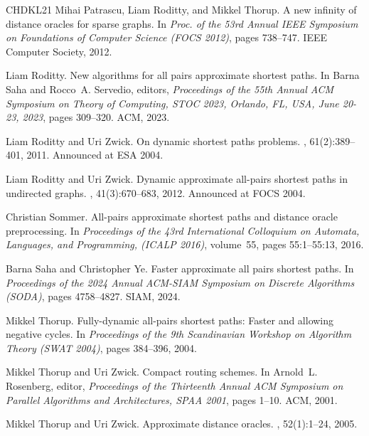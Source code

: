 \documentclass[11pt]{article}
\theoremstyle{definition}
\theoremstyle{remark}
\begin{document}
\begin{titlepage}
\begin{thebibliography}{CHDKL21}
Mihai Patrascu, Liam Roditty, and Mikkel Thorup.
\newblock A new infinity of distance oracles for sparse graphs.
\newblock In {\em Proc. of the 53rd Annual {IEEE} Symposium on Foundations of
  Computer Science ({FOCS} 2012)}, pages 738--747. {IEEE} Computer Society,
  2012.

Liam Roditty.
\newblock New algorithms for all pairs approximate shortest paths.
\newblock In Barna Saha and Rocco~A. Servedio, editors, {\em Proceedings of the
  55th Annual {ACM} Symposium on Theory of Computing, {STOC} 2023, Orlando, FL,
  USA, June 20-23, 2023}, pages 309--320. {ACM}, 2023.

Liam Roditty and Uri Zwick.
\newblock On dynamic shortest paths problems.
, 61(2):389--401, 2011.
\newblock Announced at {ESA} 2004.

Liam Roditty and Uri Zwick.
\newblock Dynamic approximate all-pairs shortest paths in undirected graphs.
, 41(3):670--683, 2012.
\newblock Announced at {FOCS} 2004.

Christian Sommer.
\newblock All-pairs approximate shortest paths and distance oracle
  preprocessing.
\newblock In {\em Proceedings of the 43rd International Colloquium on Automata,
  Languages, and Programming, ({ICALP} 2016)}, volume~55, pages 55:1--55:13,
  2016.

Barna Saha and Christopher Ye.
\newblock Faster approximate all pairs shortest paths.
\newblock In {\em Proceedings of the 2024 Annual ACM-SIAM Symposium on Discrete
  Algorithms (SODA)}, pages 4758--4827. SIAM, 2024.

Mikkel Thorup.
\newblock Fully-dynamic all-pairs shortest paths: Faster and allowing negative
  cycles.
\newblock In {\em Proceedings of the 9th Scandinavian Workshop on Algorithm
  Theory ({SWAT} 2004)}, pages 384--396, 2004.

Mikkel Thorup and Uri Zwick.
\newblock Compact routing schemes.
\newblock In Arnold~L. Rosenberg, editor, {\em Proceedings of the Thirteenth
  Annual {ACM} Symposium on Parallel Algorithms and Architectures, {SPAA}
  2001}, pages 1--10. {ACM}, 2001.

Mikkel Thorup and Uri Zwick.
\newblock Approximate distance oracles.
, 52(1):1--24, 2005.


\end{thebibliography}
\end{titlepage}
\end{document}
